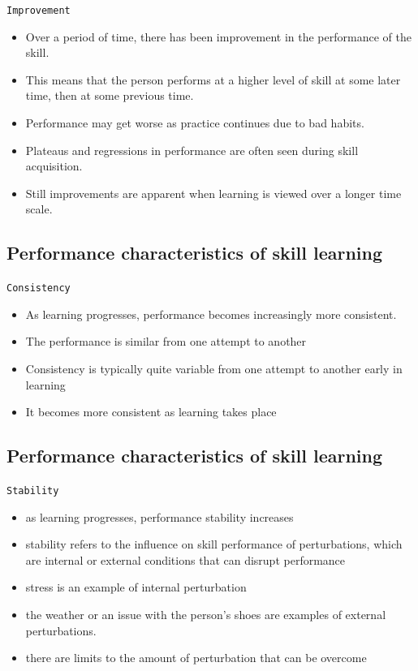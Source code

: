 \documentclass[
  letterpaper,
  DIV=11,
  numbers=noendperiod]{scrartcl}
\providecommand{\tightlist}{%
  \setlength{\itemsep}{0pt}\setlength{\parskip}{0pt}}\usepackage{longtable,booktabs,array}
\begin{document}
\texttt{Improvement}

\begin{itemize}
\tightlist
\item
  Over a period of time, there has been improvement in the performance
  of the skill.
\item
  This means that the person performs at a higher level of skill at some
  later time, then at some previous time.
\item
  Performance may get worse as practice continues due to bad habits.
\item
  Plateaus and regressions in performance are often seen during skill
  acquisition.
\item
  Still improvements are apparent when learning is viewed over a longer
  time scale.
\end{itemize}

\hypertarget{performance-characteristics-of-skill-learning-1}{%
\subsection{Performance characteristics of skill
learning}\label{performance-characteristics-of-skill-learning-1}}

\texttt{Consistency}

\begin{itemize}
\tightlist
\item
  As learning progresses, performance becomes increasingly more
  consistent.
\item
  The performance is similar from one attempt to another
\item
  Consistency is typically quite variable from one attempt to another
  early in learning
\item
  It becomes more consistent as learning takes place
\end{itemize}

\hypertarget{performance-characteristics-of-skill-learning-2}{%
\subsection{Performance characteristics of skill
learning}\label{performance-characteristics-of-skill-learning-2}}

\texttt{Stability}

\begin{itemize}
\tightlist
\item
  as learning progresses, performance stability increases
\item
  stability refers to the influence on skill performance of
  perturbations, which are internal or external conditions that can
  disrupt performance
\item
  stress is an example of internal perturbation
\item
  the weather or an issue with the person's shoes are examples of
  external perturbations.
\item
  there are limits to the amount of perturbation that can be overcome
\end{itemize}
\end{document}
